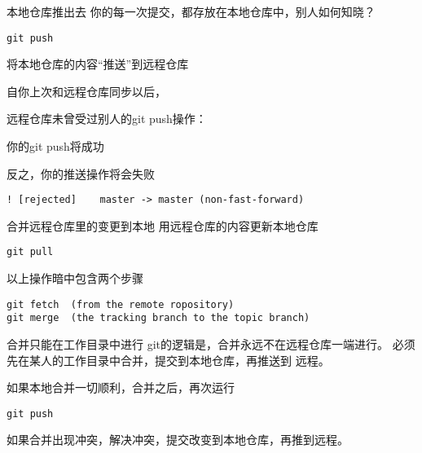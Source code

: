 \begin{frame}[<+->][fragile]{本地仓库推出去}
\onslide<+->
你的每一次提交，都存放在本地仓库中，别人如何知晓？
\onslide<+->
\begin{Verbatim}[frame=single,commandchars=\\\{\}]
git push
\end{Verbatim}
将本地仓库的内容“推送”到远程仓库

\onslide<+->
\medskip
自你上次和远程仓库同步以后，
\medskip

\onslide<+->
    远程仓库未曾受过别人的git push操作：
    
    你的git push将成功

\onslide<+->
\medskip
    反之，你的推送操作将会失败

    \begin{Verbatim}[frame=single,commandchars=\\\{\}]
! [rejected]    master -> master (non-fast-forward)
    \end{Verbatim}
\end{frame}

\begin{frame}[<+->][fragile]{合并远程仓库里的变更到本地}
\onslide<+->
用远程仓库的内容更新本地仓库
\begin{Verbatim}[frame=single,commandchars=\\\{\}]
git pull
\end{Verbatim}

\onslide<+->
以上操作暗中包含两个步骤
\begin{Verbatim}[frame=single,commandchars=\\\{\}]
git fetch  (from the remote ropository)
git merge  (the tracking branch to the topic branch)
\end{Verbatim}
\end{frame}

\begin{frame}[<+->][fragile]{合并只能在工作目录中进行}
\onslide<+->
git的逻辑是，合并永远不在远程仓库一端进行。
必须先在某人的工作目录中合并，提交到本地仓库，再推送到
远程。

\medskip
\onslide<+->
如果本地合并一切顺利，合并之后，再次运行
\begin{Verbatim}[frame=single,commandchars=\\\{\}]
git push
\end{Verbatim}

\onslide<+->
如果合并出现冲突，解决冲突，提交改变到本地仓库，再推到远程。
\end{frame}


